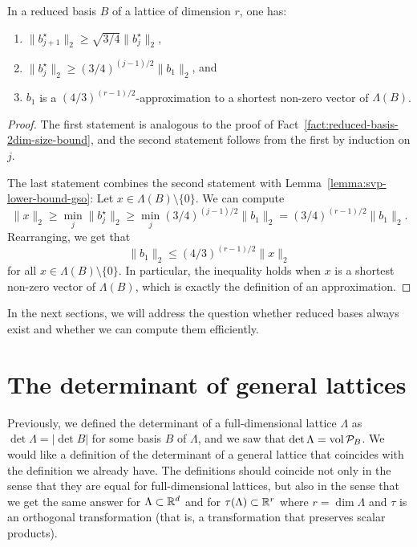 \begin{lemma}
  \label{lemma:size-bounds-reduced-basis}
  In a reduced basis $B$ of a lattice of dimension $r$, one has:
  \begin{enumerate}
    \item $\|b_{j+1}^\star\|_2 \geq \sqrt{3/4} \|b_j^\star\|_2$,
    \item $\|b_j^\star\|_2 \geq (3/4)^{(j-1)/2} \|b_1\|_2$, and
    \item $b_1$ is a $(4/3)^{(r-1)/2}$-approximation to a shortest non-zero vector of $\Lambda(B)$.
  \end{enumerate}
\end{lemma}
\begin{proof}
  The first statement is analogous to the proof of Fact~\ref{fact:reduced-basis-2dim-size-bound},
  and the second statement follows from the first by induction on $j$.

  The last statement combines the second statement with Lemma~\ref{lemma:svp-lower-bound-gso}:
  Let $x \in \Lambda(B) \setminus \{ 0 \}$.
  We can compute
  \[
    \|x\|_2 \geq \min_j \|b_j^\star\|_2 \geq \min_j (3/4)^{(j-1)/2} \|b_1\|_2 = (3/4)^{(r-1)/2} \|b_1\|_2.
  \]
  Rearranging, we get that
  \[
    \|b_1\|_2 \leq (4/3)^{(r-1)/2} \|x\|_2
  \]
  for all $x \in \Lambda(B) \setminus \{ 0 \}$.
  In particular, the inequality holds when $x$ is a shortest non-zero vector of $\Lambda(B)$,
  which is exactly the definition of an approximation.
\end{proof}

In the next sections, we will address the question
whether reduced bases always exist and whether we can compute them efficiently.



\section{The determinant of general lattices}
\label{sec:determinant-general-lattices}

Previously, we defined the determinant of a full-dimensional lattice $\Lambda$
as $\det \Lambda = |\det B|$ for some basis $B$ of $\Lambda$,
and we saw that $\det \Lambda = \operatorname{vol} \mathcal{P}_B$.
We would like a definition of the determinant of a general lattice that coincides
with the definition we already have.
The definitions should coincide not only in the sense that they are equal for full-dimensional lattices,
but also in the sense that we get the same answer for $\Lambda \subset \mathbb{R}^d$
and for $\tau(\Lambda) \subset \mathbb{R}^r$ where $r = \dim\Lambda$ and $\tau$ is an orthogonal transformation
(that is, a transformation that preserves scalar products).


